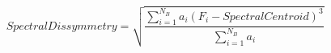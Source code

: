 \begin{displaymath}
\mathit{SpectralDissymmetry} = \sqrt{\frac{\sum_{i=1}^{N_B} a_i (F_i - \mathit{SpectralCentroid})^3}{\sum_{i=1}^{N_B} a_i}}
\label{eq:spectral_dissymmetry}
\end{displaymath}
